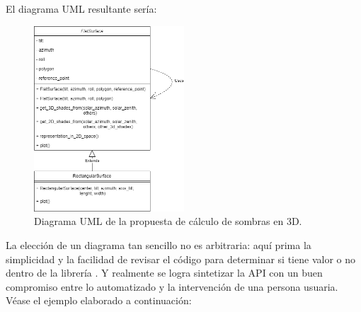 El diagrama UML resultante sería:

\begin{figure}[H]
    \centering
    \includegraphics[width=0.5\textwidth]{./images/shading_3d/shading_classes.png}
    \caption{Diagrama UML de la propuesta de cálculo de sombras en 3D.}
    \label{fig:uml_sombreado}
\end{figure}

La elección de un diagrama tan sencillo no es arbitraria: aquí prima la simplicidad y la facilidad de revisar el código para determinar si tiene valor o no dentro de la librería \pvlibpy. Y realmente se logra sintetizar la \gls{API} con un buen compromiso entre lo automatizado y la intervención de una persona usuaria. Véase el ejemplo elaborado a continuación:

